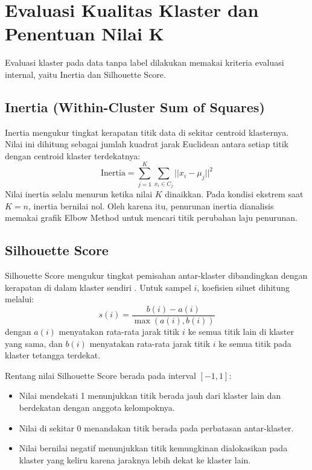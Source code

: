 \documentclass[a4paper,oneside,12pt]{report}
\begin{document}
\section{Evaluasi Kualitas Klaster dan Penentuan Nilai K}
Evaluasi klaster pada data tanpa label dilakukan memakai kriteria evaluasi internal, yaitu Inertia dan Silhouette Score.

\subsection{Inertia (Within-Cluster Sum of Squares)}
Inertia mengukur tingkat kerapatan titik data di sekitar centroid klasternya. Nilai ini dihitung sebagai jumlah kuadrat jarak Euclidean antara setiap titik dengan centroid klaster terdekatnya:
\begin{equation}
\text{Inertia} = \sum_{j=1}^{K} \sum_{x_i \in C_j} ||x_i - \mu_j||^2
\end{equation}
Nilai inertia selalu menurun ketika nilai $K$ dinaikkan. Pada kondisi ekstrem saat $K = n$, inertia bernilai nol. Oleh karena itu, penurunan inertia dianalisis memakai grafik Elbow Method untuk mencari titik perubahan laju penurunan.

\subsection{Silhouette Score}
Silhouette Score mengukur tingkat pemisahan antar-klaster dibandingkan dengan kerapatan di dalam klaster sendiri \cite{rousseeuw1987}. Untuk sampel $i$, koefisien siluet dihitung melalui:
\begin{equation}
s(i) = \frac{b(i) - a(i)}{\max(a(i), b(i))}
\end{equation}
dengan $a(i)$ menyatakan rata-rata jarak titik $i$ ke semua titik lain di klaster yang sama, dan $b(i)$ menyatakan rata-rata jarak titik $i$ ke semua titik pada klaster tetangga terdekat.

Rentang nilai Silhouette Score berada pada interval $[-1, 1]$:
\begin{itemize}[noitemsep, topsep=2pt, parsep=1pt]
    \item Nilai mendekati 1 menunjukkan titik berada jauh dari klaster lain dan berdekatan dengan anggota kelompoknya.
    \item Nilai di sekitar 0 menandakan titik berada pada perbatasan antar-klaster.
    \item Nilai bernilai negatif menunjukkan titik kemungkinan dialokasikan pada klaster yang keliru karena jaraknya lebih dekat ke klaster lain.
\end{itemize}
\end{document}
